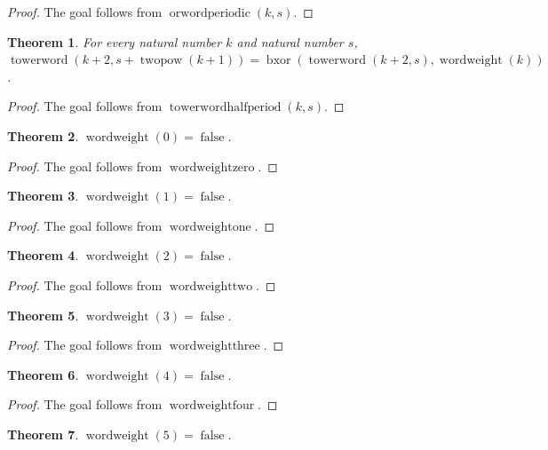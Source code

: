 \documentclass[11pt]{article}
\newtheorem{theorem}{Theorem}[section]
\theoremstyle{definition}
\begin{document}
\begin{proof}
The goal follows from \(\operatorname{orwordperiodic}(k, s)\).
\end{proof}
\begin{theorem}
\label{ll:observations:tower-word-half-period}
For every natural number \(k\) and natural number \(s\), \(\operatorname{towerword}(k + 2, s + \operatorname{twopow}(k + 1)) = \operatorname{bxor}(\operatorname{towerword}(k + 2, s), \operatorname{wordweight}(k))\).
\end{theorem}
\begin{proof}
The goal follows from \(\operatorname{towerwordhalfperiod}(k, s)\).
\end{proof}
\begin{theorem}
\label{ll:observations:word-weight-zero}
\(\operatorname{wordweight}(0) = \operatorname{false}\).
\end{theorem}
\begin{proof}
The goal follows from \(\operatorname{wordweightzero}\).
\end{proof}
\begin{theorem}
\label{ll:observations:word-weight-one}
\(\operatorname{wordweight}(1) = \operatorname{false}\).
\end{theorem}
\begin{proof}
The goal follows from \(\operatorname{wordweightone}\).
\end{proof}
\begin{theorem}
\label{ll:observations:word-weight-two}
\(\operatorname{wordweight}(2) = \operatorname{false}\).
\end{theorem}
\begin{proof}
The goal follows from \(\operatorname{wordweighttwo}\).
\end{proof}
\begin{theorem}
\label{ll:observations:word-weight-three}
\(\operatorname{wordweight}(3) = \operatorname{false}\).
\end{theorem}
\begin{proof}
The goal follows from \(\operatorname{wordweightthree}\).
\end{proof}
\begin{theorem}
\label{ll:observations:word-weight-four}
\(\operatorname{wordweight}(4) = \operatorname{false}\).
\end{theorem}
\begin{proof}
The goal follows from \(\operatorname{wordweightfour}\).
\end{proof}
\begin{theorem}
\label{ll:observations:word-weight-five}
\(\operatorname{wordweight}(5) = \operatorname{false}\).
\end{theorem}
\end{document}
